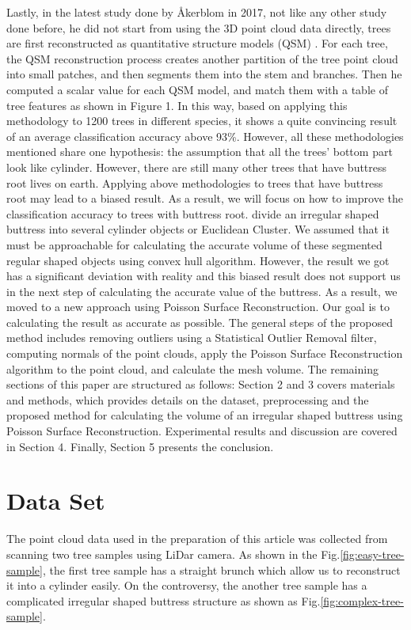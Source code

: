 \documentclass[runningheads,a4paper]{llncs}
\begin{document}
Lastly, in the latest study done by Åkerblom in 2017, not like any other study done before, he did not start from using the 3D point cloud data directly, trees are first reconstructed as quantitative structure models (QSM) \cite{5}.  For each tree, the QSM reconstruction process creates another partition of the tree point cloud into small patches, and then segments them into the stem and branches. Then he computed a scalar value for each QSM model, and match them with a table of tree features as shown in Figure 1. In this way, based on applying this methodology to 1200 trees in different species, it shows a quite convincing result of an average classification accuracy above 93\%.
However, all these methodologies mentioned share one hypothesis: the assumption that all the trees’ bottom part look like cylinder. However, there are still many other trees that have buttress root lives on earth. Applying above methodologies to trees that have buttress root may lead to a biased result. As a result, we will focus on how to improve the classification accuracy to trees with buttress root.
divide an irregular shaped buttress into several cylinder objects or Euclidean Cluster. We assumed that it must be approachable for calculating the accurate volume of these segmented regular shaped objects using convex hull algorithm. However, the result we got has a significant deviation with reality and this biased result does not support us in the next step of calculating the accurate value of the buttress. As a result, we moved to a new approach using Poisson Surface Reconstruction. Our goal is to calculating the result as accurate as possible. The general steps of the proposed method includes removing outliers using a Statistical Outlier Removal filter, computing normals of the point clouds, apply the Poisson Surface Reconstruction algorithm to the point cloud, and calculate the mesh volume.
The remaining sections of this paper are structured as follows: Section 2 and 3 covers materials and methods, which provides details on the dataset, preprocessing and the proposed method for calculating the volume of an irregular shaped buttress using Poisson Surface Reconstruction. Experimental results and discussion are covered in Section 4. Finally, Section 5 presents the conclusion.



\section{Data Set}
The point cloud data used in the preparation of this article was collected from scanning two tree samples using LiDar camera. As shown in the Fig.\ref{fig:easy-tree-sample}, the first tree sample has a straight brunch which allow us to reconstruct it into a cylinder easily. On the controversy, the another tree sample has a complicated irregular shaped buttress structure as shown as Fig.\ref{fig:complex-tree-sample}.
\end{document}
